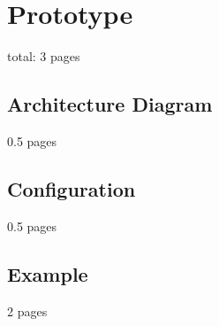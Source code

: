 \chapter{Prototype}
\label{chap:prototype}

total: 3 pages

\section{Architecture Diagram}
\label{sec:p_architecture_diagram}

0.5 pages

\section{Configuration}
\label{sec:p_configuration}

0.5 pages

\section{Example}
\label{sec:p_example}

2 pages